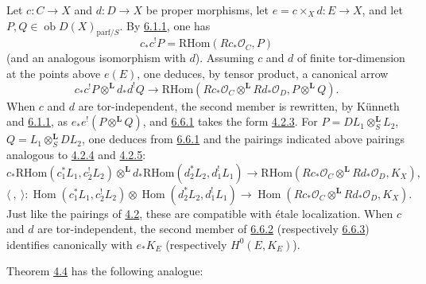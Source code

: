 \documentclass[11pt]{article}
\providecommand{\cO}{\mathcal{O}}
\DeclareMathOperator{\Hom}{Hom}
\providecommand{\RHom}{\mathrm{RHom}}
\providecommand{\RHom}{\mathrm{RHom}}
\providecommand{\Hom}{\operatorname{Hom}}
\providecommand{\RHom}{\mathrm R\mathcal{H}om}
\providecommand{\RHom}{\mathrm{RHom}}
\providecommand{\Hom}{\operatorname{Hom}}
\begin{document}
Let $c:C\to X$ and $d:D\to X$ be proper morphisms, let $e=c\times_Xd:E\to X$, and let $P,Q\in\operatorname{ob}D(X)_{\mathrm{parf}/S}$. By \hyperref[sga5:III:equation:6.1.1]{6.1.1}, one has
\[
c_*c^!P=\RHom(Rc_*\cO_C,P)
\]
(and an analogous isomorphism with $d$). Assuming $c$ and $d$ of finite tor-dimension at the points above $e(E)$, one deduces, by tensor product, a canonical arrow
\begin{equation}
\tag{6.6.1}\label{sga5:III:equation:6.6.1}
c_*c^!P\otimes^{\mathbf L}d_*d^!Q\longrightarrow
\RHom(Rc_*\cO_C\otimes^{\mathbf L}Rd_*\cO_D,P\otimes^{\mathbf L}Q).
\end{equation}
When $c$ and $d$ are tor-independent, the second member is rewritten, by Künneth and \hyperref[sga5:III:equation:6.1.1]{6.1.1}, as $e_*e^!(P\otimes^{\mathbf L}Q)$, and \hyperref[sga5:III:equation:6.6.1]{6.6.1} takes the form \hyperref[sga5:III:equation:4.2.3]{4.2.3}. For $P=DL_1\otimes_S^{\mathbf L}L_2$, $Q=L_1\otimes_S^{\mathbf L}DL_2$, one deduces from \hyperref[sga5:III:equation:6.6.1]{6.6.1} and the pairings indicated above pairings analogous to \hyperref[sga5:III:equation:4.2.4]{4.2.4} and \hyperref[sga5:III:equation:4.2.5]{4.2.5}:
\begin{equation}
\tag{6.6.2}\label{sga5:III:equation:6.6.2}
c_*\RHom(c_1^*L_1,c_2^!L_2)\otimes^{\mathbf L}d_*\RHom(d_2^*L_2,d_1^!L_1)
\longrightarrow\RHom(Rc_*\cO_C\otimes^{\mathbf L}Rd_*\cO_D,K_X),
\end{equation}
\begin{equation}
\tag{6.6.3}\label{sga5:III:equation:6.6.3}
\langle\ ,\ \rangle:\Hom(c_1^*L_1,c_2^!L_2)\otimes\Hom(d_2^*L_2,d_1^!L_1)
\longrightarrow\Hom(Rc_*\cO_C\otimes^{\mathbf L}Rd_*\cO_D,K_X).
\end{equation}
Just like the pairings of \hyperref[sga5:III:subsection:4.2]{4.2}, these are compatible with étale localization. When $c$ and $d$ are tor-independent, the second member of \hyperref[sga5:III:equation:6.6.2]{6.6.2} (respectively \hyperref[sga5:III:equation:6.6.3]{6.6.3}) identifies canonically with $e_*K_E$ (respectively $H^0(E,K_E)$).

\label{sga5:III:theorem:4}Theorem \hyperref[sga5:III:theorem:4.4]{4.4} has the following analogue:
\end{document}
